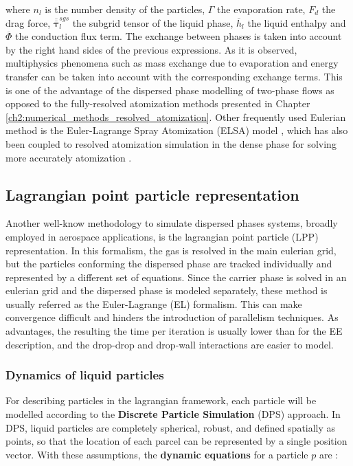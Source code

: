 where $n_l$ is the number density of the particles, $\Gamma$ the evaporation rate, $F_{d}$ the drag force, $\overline{\overline{\pmb{\tau}}}_l^{sgs}$ the subgrid tensor of the liquid phase, $\overline{h}_l$ the liquid enthalpy and $\overline{\Phi}$ the conduction flux term. The exchange between phases is taken into account by the right hand sides of the previous expressions. As it is observed, multiphysics phenomena such as mass exchange due to evaporation and energy transfer can be taken into account with the corresponding exchange terms.  This is one of the advantage of the dispersed phase modelling of two-phase flows as opposed to the fully-resolved atomization methods presented in Chapter \ref{ch2:numerical_methods_resolved_atomization}.  Other frequently used Eulerian method is the Euler-Lagrange Spray Atomization (ELSA) model , which has also been coupled to resolved atomization simulation in the dense phase for solving more accurately atomization .

\subsection{Lagrangian point particle representation}
\label{sec:ch3_EL_formalisms}

Another well-know methodology to simulate dispersed phases systems, broadly employed in aerospace applications, is the lagrangian point particle (LPP) representation. In this formalism, the gas is resolved in the main eulerian grid, but the particles conforming the dispersed phase are tracked individually and represented by a different set of equations. Since the carrier phase is solved in an eulerian grid and the dispersed phase is modeled separately, these method is usually referred as the Euler-Lagrange (EL) formalism. This can make convergence difficult and hinders the introduction of parallelism techniques. As advantages, the resulting the time per iteration is usually lower than for the EE description, and the drop-drop and drop-wall interactions are easier to model.

\subsubsection*{Dynamics of liquid particles}

For describing particles in the lagrangian framework, each particle will be modelled according to the \textbf{Discrete Particle Simulation} (DPS) approach. In DPS, liquid particles are completely spherical, robust, and defined spatially as points, so that the location of each parcel can be represented by a single position vector. With these assumptions, the \textbf{dynamic equations} for a particle $p$ are :


